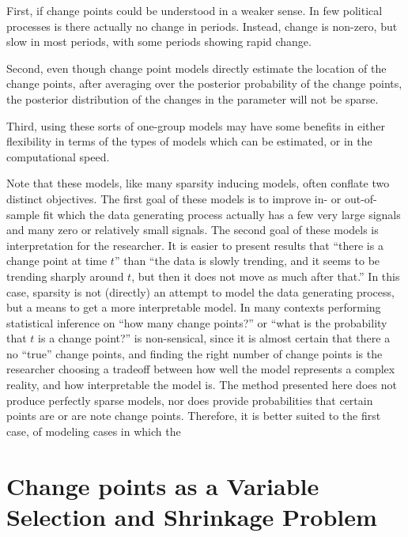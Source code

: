 First, if change points could be understood in a weaker sense. 
In few political processes is there actually no change in periods.
Instead, change is non-zero, but slow in most periods, with some periods showing rapid change.

Second, even though change point models directly estimate the location of the change points, after averaging over the posterior probability of the change points, the posterior distribution of the changes in the parameter will not be sparse. 

Third, using these sorts of one-group models may have some benefits in either flexibility in terms of the types of models which can be estimated, or in the computational speed.

Note that these models, like many sparsity inducing models, often conflate two distinct objectives. 
The first goal of these models is to improve in- or out-of-sample fit which the data generating process actually has a few very large signals and many zero or relatively small signals.
The second goal of these models is interpretation for the researcher.
It is easier to present results that ``there is a change point at time $t$'' than ``the data is slowly trending, and it seems to be trending sharply around $t$, but then it does not move as much after that.''
In this case, sparsity is not (directly) an attempt to model the data generating process, but a means to get a more interpretable model.
In many contexts performing statistical inference on ``how many change points?'' or ``what is the probability that $t$ is a change point?'' is non-sensical, since it is almost certain that there a no ``true'' change points, and finding the right number of change points is the researcher choosing a tradeoff between how well the model represents a complex reality, and how interpretable the model is.
The method presented here does not produce perfectly sparse models, nor does provide probabilities that certain points are or are note change points. 
Therefore, it is better suited to the first case, of modeling cases in which the 


\section{Change points as a Variable Selection and Shrinkage Problem}
\label{dlm:sec:chang-as-vari}


